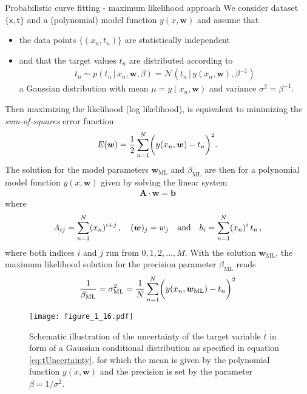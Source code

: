 \documentclass[11pt, DINA4, fleqn]{amsart}
\def\vw{\boldsymbol{w}\xspace}
\def\vb{\boldsymbol{b}\xspace}
\def\mA{\boldsymbol{A}\xspace}
\begin{document}
\begin{mybox_tc3}{Probabilistic curve fitting - maximum likelihood approach}
We consider dataset $\{\boldsymbol{\mathsf{x}}, \boldsymbol{\mathsf{t}}\}$
and a (polynomial) model function $y(x,\bm{w})$ and
assume that
\begin{itemize}
	\item the data points $\{(x_n, t_n)\}$ are statistically independent
	\item and that the target values $t_n$ are distributed according to
	\begin{align}
	t_n  \sim p(t_n \, | \, x_n, \bm{w}, \beta) = \mathcal{N}\left(
	t_n \, \bigl| \, y(x_n,\bm{w}), \beta^{-1}\right) 
	\end{align}
	a Gaussian distribution with mean $\mu = y(x_n, \bm{w})$ and variance $\sigma^2 = \beta^{-1}$.
\end{itemize}
	Then maximizing the likelihood (log likelihood), is equivalent to minimizing the \emph{sum-of-squares} error function
	\begin{align}
	E(\bm{w}) =\dfrac{1}{2} \sum\displaylimits_{n=1}^{N} \biggl(y(x_n, \bm{w}) - t_n\biggl)^2.
	\end{align}
The solution for the model parameters $\bm{w}_{\text{ML}}$ and $\beta_{\text{ML}}$ are then for a polynomial model function $y(x,\bm{w})$ given by
solving the linear system
\begin{align}
\mA \cdot \vw = \vb
\label{eq:linearSystem}
\end{align}
where
\begin{align}
A_{ij} = \sum \displaylimits_{n = 1}^{N} (x_n)^{i + j} \, , \quad
(\vw)_j = w_j \quad \text{and} \quad
b_i = \sum \displaylimits_{n = 1}^{N} (x_n)^{i} \, t_n \, ,
\end{align}
where both indices $i$ and $j$ run from $0, 1, 2, \dotsc, M$.
With the solution $\bm{w}_{\text{ML}}$, the maximum likelihood solution for the precision parameter $\beta_{\text{ML}}$ reads
\begin{align}
\dfrac{1}{\beta_{\text{ML}}} = \sigma^2_{\text{ML}}= \dfrac{1}{N} \sum\displaylimits_{n=1}^{N} \biggl(y(x_n, \bm{w}_{\text{ML}}) - t_n\biggl)^2
\end{align}
\end{mybox_tc3}

\begin{figure}[h]
	\centering
	\texttt{[image: figure\_1\_16.pdf]}
	\caption{Schematic illustration of the uncertainty of the target variable $t$ in form of a Gaussian conditional distribution as specified in equation \eqref{eq:tUncertainty}, for which the mean is given by the polynomial function $y(x,\bm{w})$ and the precision is set by the parameter $\beta = 1/\sigma^2$.
	\label{fig:figure_1_16}}
\end{figure}
\end{document}
